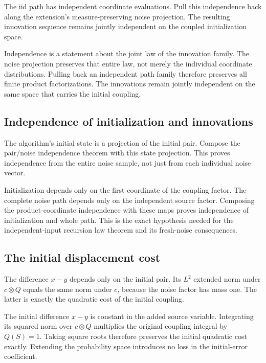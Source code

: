 \documentclass[11pt,a4paper]{report}
\begin{document}
The iid path has independent coordinate evaluations. Pull this independence back along the extension's measure-preserving noise projection. The resulting innovation sequence remains jointly independent on the coupled initialization space.



Independence is a statement about the joint law of the innovation family. The noise projection preserves that entire law, not merely the individual coordinate distributions. Pulling back an independent path family therefore preserves all finite product factorizations. The innovations remain jointly independent on the same space that carries the initial coupling.

\subsection{\texorpdfstring{Independence of initialization and innovations}{Independence of initialization and innovations}}
\label{report-step-UnadjustedLangevin-InitialExtension-lean-14}


The algorithm's initial state is a projection of the initial pair. Compose the pair/\allowbreak{}noise independence theorem with this state projection. This proves independence from the entire noise sample, not just from each individual noise vector.



Initialization depends only on the first coordinate of the coupling factor. The complete noise path depends only on the independent source factor. Composing the product-coordinate independence with these maps proves independence of initialization and whole path. This is the exact hypothesis needed for the independent-input recursion law theorem and its fresh-noise consequences.

\subsection{\texorpdfstring{The initial displacement cost}{The initial displacement cost}}
\label{report-step-UnadjustedLangevin-InitialExtension-lean-15}


The difference \(x-y\) depends only on the initial pair. Its \(L^2\) extended norm under \(c\otimes Q\) equals the same norm under \(c\), because the noise factor has mass one. The latter is exactly the quadratic cost of the initial coupling.



The initial difference \(x-y\) is constant in the added source variable. Integrating its squared norm over \(c\otimes Q\) multiplies the original coupling integral by \(Q(S)=1\). Taking square roots therefore preserves the initial quadratic cost exactly. Extending the probability space introduces no loss in the initial-error coefficient.
\end{document}
